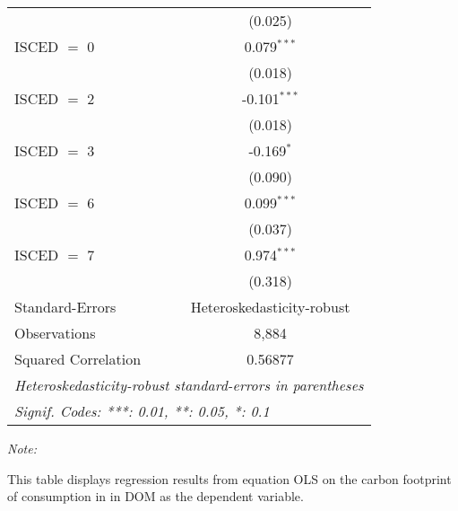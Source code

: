 \begin{table}[htbp!]
\begin{adjustbox}{width = 1\textwidth, max height = 0.95\textheight, center}
\begin{threeparttable}[b]
\begin{tabular}{lc}
                                & (0.025)\\   
            ISCED $=$ 0         & 0.079$^{***}$\\   
                                & (0.018)\\   
            ISCED $=$ 2         & -0.101$^{***}$\\   
                                & (0.018)\\   
            ISCED $=$ 3         & -0.169$^{*}$\\   
                                & (0.090)\\   
            ISCED $=$ 6         & 0.099$^{***}$\\   
                                & (0.037)\\   
            ISCED $=$ 7         & 0.974$^{***}$\\   
                                & (0.318)\\   
            \midrule 
            Standard-Errors     & Heteroskedasticity-robust \\   
            Observations        & 8,884\\  
            Squared Correlation & 0.56877\\  
            \midrule \midrule
            \multicolumn{2}{l}{\emph{Heteroskedasticity-robust standard-errors in parentheses}}\\
            \multicolumn{2}{l}{\emph{Signif. Codes: ***: 0.01, **: 0.05, *: 0.1}}\\
         \end{tabular}
         
         \begin{tablenotes}\item \medskip \textit{Note:}
            \item This table displays regression results from equation OLS on the carbon footprint of consumption in  in DOM as the dependent variable.  
         \end{tablenotes}
      \end{threeparttable}
   \end{adjustbox}
\end{table}


